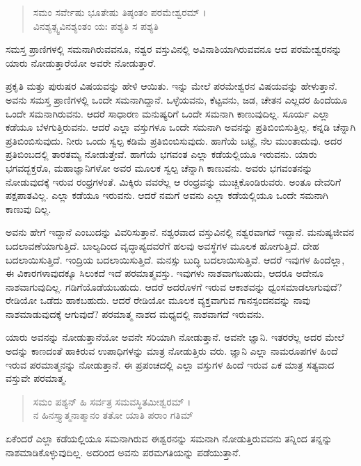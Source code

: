 \begin{verse}
ಸಮಂ ಸರ್ವೇಷು ಭೂತೇಷು ತಿಷ್ಠಂತಂ ಪರಮೇಶ್ವರಮ್ ।\\ವಿನಶ್ಯತ್ಸ್ವವಿನಶ್ಯಂತಂ ಯಃ ಪಶ್ಯತಿ ಸ ಪಶ್ಯತಿ 
\end{verse}

{\small ಸಮಸ್ತ ಪ್ರಾಣಿಗಳಲ್ಲಿ ಸಮನಾಗಿರುವವನೂ, ನಶ್ವರ ವಸ್ತುವಿನಲ್ಲಿ ಅವಿನಾಶಿಯಾಗಿರುವವನೂ ಆದ ಪರಮೇಶ್ವರನನ್ನು ಯಾರು ನೋಡುತ್ತಾರೆಯೋ ಅವರೇ ನೋಡುತ್ತಾರೆ.}

ಪ್ರಕೃತಿ ಮತ್ತು ಪುರುಷರ ವಿಷಯವನ್ನು ಹೇಳಿ ಆಯಿತು. ಇನ್ನು ಮೇಲೆ ಪರಮೇಶ್ವರನ ವಿಷಯವನ್ನು ಹೇಳುತ್ತಾನೆ. ಅವನು ಸಮಸ್ತ ಪ್ರಾಣಿಗಳಲ್ಲಿ ಒಂದೇ ಸಮನಾಗಿದ್ದಾನೆ. ಒಳ್ಳೆಯವನು, ಕೆಟ್ಟವನು, ಜಡ, ಚೇತನ ಎಲ್ಲದರ ಹಿಂದೆಯೂ ಒಂದೇ ಸಮನಾಗಿರುವನು. ಆದರೆ ಸಾಧಾರಣ ಮನುಷ್ಯರಿಗೆ ಒಂದೇ ಸಮನಾಗಿ ಕಾಣುವುದಿಲ್ಲ. ಸೂರ್ಯ ಎಲ್ಲಾ ಕಡೆಯೂ ಬೆಳಗುತ್ತಿರುವನು. ಆದರೆ ಎಲ್ಲಾ ವಸ್ತುಗಳೂ ಒಂದೇ ಸಮನಾಗಿ ಅವನನ್ನು ಪ್ರತಿಬಿಂಬಿಸುತ್ತಿಲ್ಲ. ಕನ್ನಡಿ ಚೆನ್ನಾಗಿ ಪ್ರತಿಬಿಂಬಿಸುವುದು. ನೀರು ಒಂದು ಸ್ವಲ್ಪ ಕಡಿಮೆ ಪ್ರತಿಬಿಂಬಿಸುವುದು. ಹಾಗೆಯೆ ಬಟ್ಟೆ, ನೆಲ ಮುಂತಾದುವು. ಅದರ ಪ್ರತಿಬಿಂಬದಲ್ಲಿ ತಾರತಮ್ಯ ನೋಡುತ್ತೇವೆ. ಹಾಗೆಯೆ ಭಗವಂತ ಎಲ್ಲಾ ಕಡೆಯಲ್ಲಿಯೂ ಇರುವನು. ಯಾರು ಭಗವದ್ಭಕ್ತರೊ, ಮಹಾಜ್ಞಾನಿಗಳೋ ಅವರ ಮೂಲಕ ಸ್ವಲ್ಪ ಚೆನ್ನಾಗಿ ಕಾಣುವನು. ಅವರು ಭಗವಂತನನ್ನು ನೋಡುವುದಕ್ಕೆ ಇರುವ ರಂಧ್ರಗಳಂತೆ. ಮಿಕ್ಕಿರು ವವರೆಲ್ಲ ಆ ರಂಧ್ರವನ್ನು ಮುಚ್ಚಿಕೊಂಡಿರುವರು. ಅಂತೂ ದೇವರಿಗೆ ಪಕ್ಷಪಾತವಿಲ್ಲ. ಎಲ್ಲಾ ಕಡೆಯೂ ಇರುವನು. ಆದರೆ ನಮಗೆ ಅವನು ಎಲ್ಲಾ ಕಡೆಯಲ್ಲಿಯೂ ಒಂದೇ ಸಮನಾಗಿ ಕಾಣುವು ದಿಲ್ಲ.

ಅವನು ಹೇಗೆ ಇದ್ದಾನೆ ಎಂಬುದನ್ನು ವಿವರಿಸುತ್ತಾನೆ. ನಶ್ವರವಾದ ವಸ್ತುವಿನಲ್ಲಿ ನಶ್ವರವಾಗದೆ ಇದ್ದಾನೆ. ಮನುಷ್ಯಜೀವನ ಬದಲಾವಣೆಯಾಗುತ್ತಿದೆ. ಬಾಲ್ಯದಿಂದ ವೃದ್ಧಾಪ್ಯದವರೆಗೆ ಹಲವು ಅವಸ್ಥೆಗಳ ಮೂಲಕ ಹೋಗುತ್ತಿದೆ. ದೇಹ ಬದಲಾಯಿಸುತ್ತಿದೆ. ಇಂದ್ರಿಯ ಬದಲಾಯಿಸುತ್ತಿದೆ. ಮನಸ್ಸು ಬುದ್ಧಿ ಬದಲಾಯಿಸುತ್ತಿವೆ. ಆದರೆ ಇವುಗಳ ಹಿಂದೆಲ್ಲಾ, ಈ ವಿಕಾರಗಳಾವುದಕ್ಕೂ ಸಿಲುಕದೆ ಇದೆ ಪರಮಾತ್ಮವಸ್ತು. ಇವುಗಳು ನಾಶವಾಗಬಹುದು, ಆದರೂ ಅದೇನೂ ನಾಶವಾಗುವುದಿಲ್ಲ. ಗಡಿಗೆಯೊಡೆಯಬಹುದು. ಆದರೆ ಅದರೊಳಗೆ ಇರುವ ಆಕಾಶವನ್ನು ಧ್ವಂಸಮಾಡಲಾಗುವುದೆ? ರೇಡಿಯೋ ಒಡೆದು ಹಾಕಬಹುದು. ಆದರೆ ರೇಡಿಯೋ ಮೂಲಕ ವ್ಯಕ್ತವಾಗುವ ಗಾನಸ್ಪಂದನವನ್ನು ನಾವು ನಾಶಮಾಡುವುದಕ್ಕೆ ಆಗುವುದೆ? ಪರಮಾತ್ಮ ನಾಶದ ಮಧ್ಯದಲ್ಲಿ ನಾಶವಾಗದೆ ಇರುವನು.

ಯಾರು ಅವನನ್ನು ನೋಡುತ್ತಾನೆಯೋ ಅವನೇ ಸರಿಯಾಗಿ ನೋಡುತ್ತಾನೆ. ಅವನೇ ಜ್ಞಾನಿ. ಇತರರೆಲ್ಲ ಅದರ ಮೇಲೆ ಅದನ್ನು ಕಾಣದಂತೆ ಹಾಕಿರುವ ಉಪಾಧಿಗಳನ್ನು ಮಾತ್ರ ನೋಡುತ್ತಿರು ವರು. ಜ್ಞಾನಿ ಎಲ್ಲಾ ನಾಮರೂಪಗಳ ಹಿಂದೆ ಇರುವ ಪರಮಾತ್ಮನನ್ನು ನೋಡುತ್ತಾನೆ. ಈ ಪ್ರಪಂಚದಲ್ಲಿ ಎಲ್ಲಾ ವಸ್ತುಗಳ ಹಿಂದೆ ಇರುವ ಏಕ ಮಾತ್ರ ಸತ್ಯವಾದ ವಸ್ತುವೇ ಪರಮಾತ್ಮ.

\begin{verse}
ಸಮಂ ಪಶ್ಯನ್ ಹಿ ಸರ್ವತ್ರ ಸಮವಸ್ಥಿತಮೀಶ್ವರಮ್ ।\\ನ ಹಿನಸ್ತ್ಯಾತ್ಮನಾತ್ಮಾನಂ ತತೋ ಯಾತಿ ಪರಾಂ ಗತಿಮ್ 
\end{verse}

{\small ಏಕೆಂದರೆ ಎಲ್ಲಾ ಕಡೆಯಲ್ಲಿಯೂ ಸಮನಾಗಿರುವ ಈಶ್ವರನನ್ನು ಸಮನಾಗಿ ನೋಡುತ್ತಿರುವವನು ತನ್ನಿಂದ ತನ್ನನ್ನು ನಾಶಮಾಡಿಕೊಳ್ಳುವುದಿಲ್ಲ. ಅದರಿಂದ ಅವನು ಪರಮಗತಿಯನ್ನು ಪಡೆಯುತ್ತಾನೆ.}


